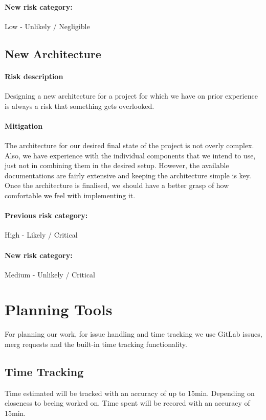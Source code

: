 \paragraph{New risk category:} Low - Unlikely / Negligible

\subsection{New Architecture}
\paragraph{Risk description} Designing a new architecture for a project for which we have on prior experience is always a risk that something gets overlooked.
\paragraph{Mitigation} The architecture for our desired final state of the project is not overly complex. Also, we have experience with the individual components that we intend to use, just not in combining them in the desired setup. However, the available documentations are fairly extensive and keeping the architecture simple is key. Once the architecture is finalised, we should have a better grasp of how comfortable we feel with implementing it.
\paragraph{Previous risk category:} High - Likely / Critical
\paragraph{New risk category:} Medium - Unlikely / Critical


\section{Planning Tools}
For planning our work, for issue handling and time tracking we use GitLab issues, merg requests and the built-in time tracking functionality.

\subsection{Time Tracking}
Time estimated will be tracked with an accuracy of up to 15min. Depending on closeness to beeing worked on.
Time spent will be recored with an accuracy of 15min.
